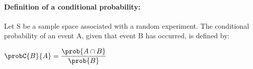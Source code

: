 \paragraph{Definition of a conditional probability:}
Let S be a sample space associated with a random experiment. The 
conditional probability of an event A, given that event B has occurred, is
defined by:
\begin{center}
	$\probC{B}{A}=\dfrac{\prob{A\cap B}}{\prob{B}}$
\end{center}
